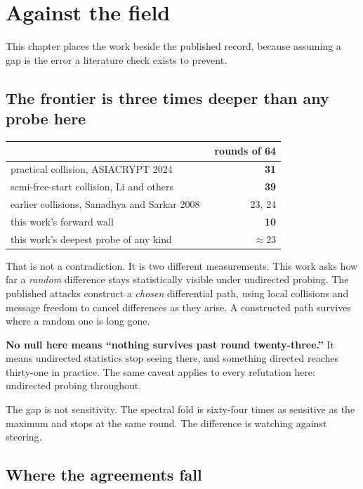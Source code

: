 \chapter{Against the field}

This chapter places the work beside the published record, because assuming a gap is the error a literature check exists to prevent.

\section{The frontier is three times deeper than any probe here}

\begin{center}
\begin{tabular}{lr}
\toprule
 & rounds of 64 \\
\midrule
practical collision, ASIACRYPT 2024~\cite{src:Li-Liu-Wang-Dong-and-Sun-2024} & \textbf{31} \\
semi-free-start collision, Li and others~\cite{src:Li-Liu-and-Wang-2024} & \textbf{39} \\
earlier collisions, Sanadhya and Sarkar 2008~\cite{src:Sanadhya-and-Sarkar-2008} & 23, 24 \\
this work's forward wall & \textbf{10} \\
this work's deepest probe of any kind & \(\approx 23\) \\
\bottomrule
\end{tabular}
\end{center}

That is not a contradiction. It is two different measurements. This work asks how far a \emph{random} difference stays statistically visible under undirected probing. The published attacks construct a \emph{chosen} differential path, using local collisions and message freedom to cancel differences as they arise. A constructed path survives where a random one is long gone.

\textbf{No null here means ``nothing survives past round twenty-three.''} It means undirected statistics stop seeing there, and something directed reaches thirty-one in practice. The same caveat applies to every refutation here: undirected probing throughout.

The gap is not sensitivity. The spectral fold is sixty-four times as sensitive as the maximum and stops at the same round. The difference is watching against steering.

\section{Where the agreements fall}

